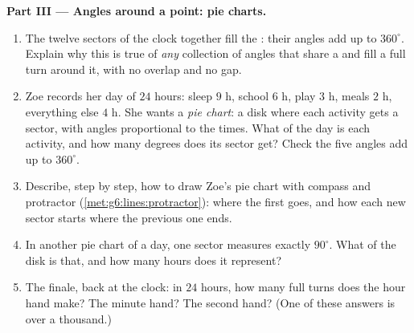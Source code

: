 \begin{problem}
\medskip
\noindent\textbf{Part III --- Angles around a point: pie
charts.}
\begin{enumerate}[resume]
  \item The twelve sectors of the clock  together fill the
        : their angles add up to $360^\circ$. Explain why
        this is true of \emph{any} collection of angles that
        share a  and fill a full turn around it, with no
        overlap and no gap.
  \item Zoe records her day of $24$ hours: sleep $9$ h, school
        $6$ h, play $3$ h, meals $2$ h, everything else $4$ h.
        She wants a \emph{pie chart}: a disk where each activity
        gets a sector, with angles proportional to the times.
        What  of the day is each activity, and how many
        degrees does its sector get? Check the five angles add up
        to $360^\circ$.
  \item Describe, step by step, how to draw Zoe's pie chart with
        compass and protractor
        (\cref{met:g6:lines:protractor}): where the first 
        goes, and how each new sector starts where the previous
        one ends.
  \item In another pie chart of a day, one sector measures
        exactly $90^\circ$. What  of the disk is that,
        and how many hours does it represent?
  \item The finale, back at the clock: in $24$ hours, how many
        full turns does the hour hand make? The minute hand? The
        second hand? (One of these answers is over a thousand.)
\end{enumerate}
\end{problem}
